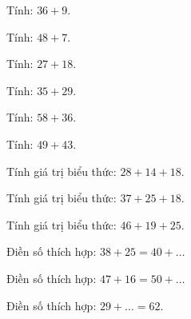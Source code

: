 \begin{ex}
Tính: $36 + 9$.
\end{ex}

\begin{ex}
Tính: $48 + 7$.
\end{ex}

\begin{ex}
Tính: $27 + 18$.
\end{ex}

\begin{ex}
Tính: $35 + 29$.
\end{ex}

\begin{ex}
Tính: $58 + 36$.
\end{ex}

\begin{ex}
Tính: $49 + 43$.
\end{ex}

\begin{ex}
Tính giá trị biểu thức: $28 + 14 + 18$.
\end{ex}

\begin{ex}
Tính giá trị biểu thức: $37 + 25 + 18$.
\end{ex}

\begin{ex}
Tính giá trị biểu thức: $46 + 19 + 25$.
\end{ex}

\begin{ex}
Điền số thích hợp: $38 + 25 = 40 + \dots$
\end{ex}

\begin{ex}
Điền số thích hợp: $47 + 16 = 50 + \dots$
\end{ex}

\begin{ex}
Điền số thích hợp: $29 + \dots = 62$.
\end{ex}

